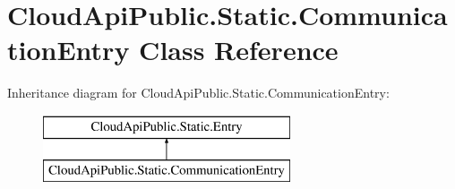 \hypertarget{class_cloud_api_public_1_1_static_1_1_communication_entry}{\section{Cloud\-Api\-Public.\-Static.\-Communication\-Entry Class Reference}
\label{class_cloud_api_public_1_1_static_1_1_communication_entry}
}


 


Inheritance diagram for Cloud\-Api\-Public.\-Static.\-Communication\-Entry\-:\begin{figure}[H]
\begin{center}
\leavevmode
\includegraphics[height=2.000000cm]{class_cloud_api_public_1_1_static_1_1_communication_entry}
\end{center}
\end{figure}
